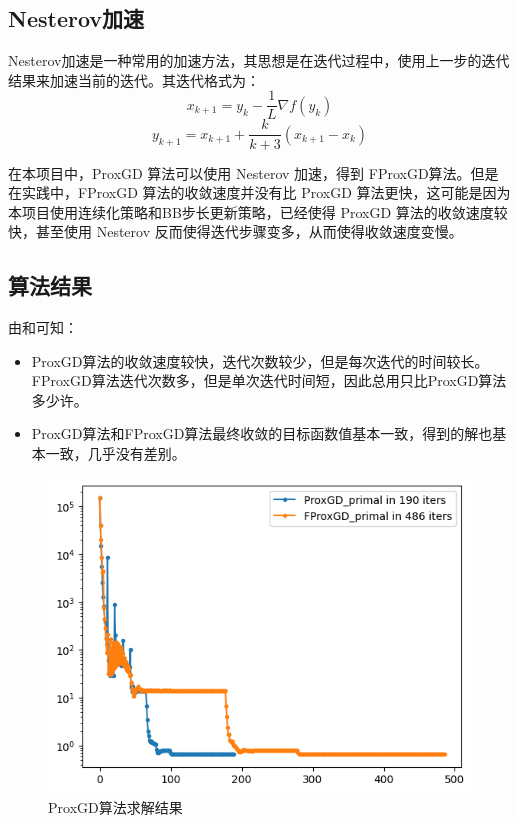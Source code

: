 \documentclass[journal, a4paper]{IEEEtran}
\begin{document}
\subsection{\textbf{Nesterov加速}}

Nesterov加速是一种常用的加速方法，其思想是在迭代过程中，使用上一步的迭代结果来加速当前的迭代。其迭代格式为：
$$
x_{k+1} = y_k - \frac{1}{L} \nabla f(y_k)
$$
$$
y_{k+1} = x_{k+1} + \frac{k}{k+3}(x_{k+1} - x_k)
$$

在本项目中，ProxGD 算法可以使用 Nesterov 加速，得到 FProxGD算法。但是在实践中，FProxGD 算法的收敛速度并没有比 ProxGD 算法更快，这可能是因为本项目使用连续化策略和BB步长更新策略，已经使得 ProxGD 算法的收敛速度较快，甚至使用 Nesterov 反而使得迭代步骤变多，从而使得收敛速度变慢。



\subsection{\textbf{算法结果}}

由和可知：
\begin{itemize}
    \item ProxGD算法的收敛速度较快，迭代次数较少，但是每次迭代的时间较长。FProxGD算法迭代次数多，但是单次迭代时间短，因此总用只比ProxGD算法多少许。
    \item ProxGD算法和FProxGD算法最终收敛的目标函数值基本一致，得到的解也基本一致，几乎没有差别。
\end{itemize}

\begin{figure}[htbp]
    \centering
    \includegraphics[width=0.8\columnwidth]{img/ProxGD.png}
    {\centering \small \caption{ProxGD算法求解结果\label{fig:ProxGD}}}
\end{figure}
\end{document}
